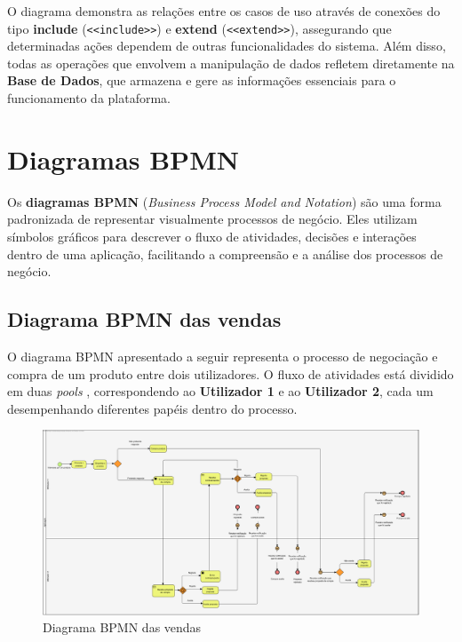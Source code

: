 \documentclass[a4paper, 12pt]{article} %
\begin{document}
O diagrama demonstra as relações entre os casos de uso através de conexões do tipo \textbf{include} (\texttt{<<include>>}) e \textbf{extend} (\texttt{<<extend>>}), assegurando que determinadas ações dependem de outras funcionalidades do sistema. Além disso, todas as operações que envolvem a manipulação de dados refletem diretamente na \textbf{Base de Dados}, que armazena e gere as informações essenciais para o funcionamento da plataforma.
\newpage
\section{Diagramas BPMN}

Os \textbf{diagramas BPMN} (\textit{Business Process Model and Notation}) são uma forma padronizada de representar visualmente processos de negócio. Eles utilizam símbolos gráficos para descrever o fluxo de atividades, decisões e interações dentro de uma aplicação, facilitando a compreensão e a análise dos processos de negócio.

\subsection{Diagrama BPMN das vendas}

O diagrama BPMN apresentado a seguir representa o processo de negociação e compra de um produto entre dois utilizadores. O fluxo de atividades está dividido em duas \textit{pools} , correspondendo ao \textbf{Utilizador 1} e ao \textbf{Utilizador 2}, cada um desempenhando diferentes papéis dentro do processo.

\begin{figure}[ht]
	\centering
	\includegraphics[width=\textwidth]{../images/bpmn-sales.png}
	\caption{Diagrama BPMN das vendas}
	\label{fig:bpmn vendas}
\end{figure}
\end{document}
